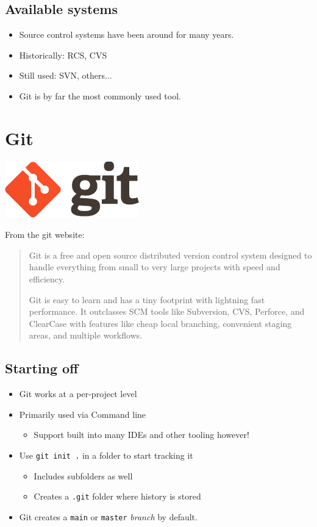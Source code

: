 \documentclass[slides]{pgnotes}
\begin{document}
\subsection{Available systems}

\begin{itemize}
\item Source control systems have been around for many years.
\item Historically: RCS, CVS
\item Still used: SVN, others...
\item Git is by far the most commonly used tool.
\end{itemize}

\section{Git}

\begin{center}
  \includegraphics[width=0.2\linewidth]{git_logo}
\end{center}

From the git website:
\begin{quote}
  Git is a free and open source distributed version control system designed to handle everything from small to very large projects with speed and efficiency.

Git is easy to learn and has a tiny footprint with lightning fast performance. It outclasses SCM tools like Subversion, CVS, Perforce, and ClearCase with features like cheap local branching, convenient staging areas, and multiple workflows.
\end{quote}


\subsection{Starting off}

\begin{itemize}
\item Git works at a per-project level
\item Primarily used via Command line
  \begin{itemize}
  \item Support built into many IDEs and other tooling however!
  \end{itemize}
\item Use \texttt{git init .} in a folder to start tracking it
  \begin{itemize}
  \item Includes subfolders as well
  \item Creates a \texttt{.git} folder where history is stored
  \end{itemize}
\item Git creates a \texttt{main} or \texttt{master} \textit{branch} by default. 
\end{itemize}
\end{document}
